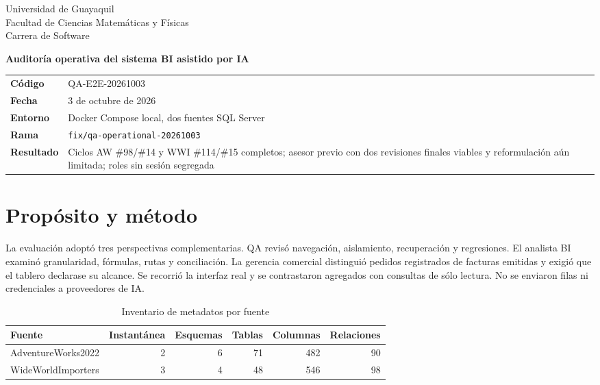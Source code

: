 \documentclass[10pt,letterpaper]{article}
\begin{document}
\begin{titlepage}
\vspace*{1cm}{\color{azul}\rule{\textwidth}{3pt}}
\vspace{1.3cm}
{\Large Universidad de Guayaquil\\Facultad de Ciencias Matemáticas y Físicas\\Carrera de Software\par}
\vfill
{\Huge\bfseries Auditoría operativa del sistema BI asistido por IA\par}
\vspace{0.5cm}{\Large Casos funcionales, evidencia cuantitativa y límites semánticos\par}
\vspace{0.8cm}{\large AdventureWorks2022 y WideWorldImporters\par}
\vfill
\begin{tabularx}{\textwidth}{@{}>{\bfseries}p{}X@{}}
Código & QA-E2E-20261003\\
Fecha & 3 de octubre de 2026\\
Entorno & Docker Compose local, dos fuentes SQL Server\\
Rama & \texttt{fix/qa-operational-20261003}\\
Resultado & Ciclos AW \#98/\#14 y WWI \#114/\#15 completos; asesor previo con dos revisiones finales viables y reformulación aún limitada; roles sin sesión segregada\\
\end{tabularx}
\vspace{1cm}{\color{azul}\rule{\textwidth}{3pt}}
\end{titlepage}

\section{Propósito y método}
La evaluación adoptó tres perspectivas complementarias. QA revisó navegación, aislamiento, recuperación y regresiones. El analista BI examinó granularidad, fórmulas, rutas y conciliación. La gerencia comercial distinguió pedidos registrados de facturas emitidas y exigió que el tablero declarase su alcance. Se recorrió la interfaz real y se contrastaron agregados con consultas de sólo lectura. No se enviaron filas ni credenciales a proveedores de IA.

\begin{table}[H]\centering
\caption{Inventario de metadatos por fuente}
\begin{tabular}{@{}lrrrrr@{}}\toprule
Fuente & Instantánea & Esquemas & Tablas & Columnas & Relaciones\\\midrule
AdventureWorks2022 & 2 & 6 & 71 & 482 & 90\\
WideWorldImporters & 3 & 4 & 48 & 546 & 98\\\bottomrule
\end{tabular}\end{table}
\end{document}
